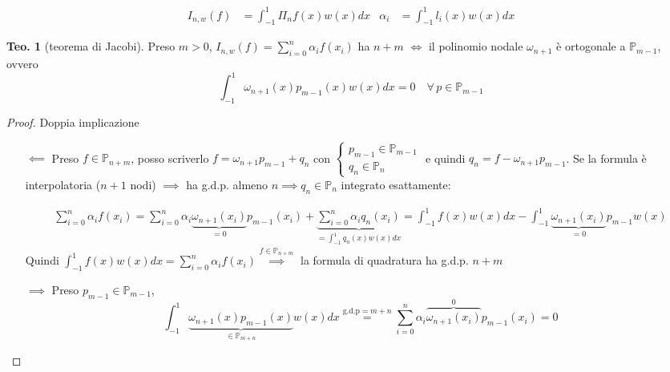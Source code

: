 \documentclass[a4paper,10pt]{article}
\theoremstyle{definition}
\theoremstyle{indentdefinition}
\theoremstyle{indenttheorem}
\newtheorem{thm}{Teo.}
\theoremstyle{myremark}
\theoremstyle{indentgeneral}
\theoremstyle{plain}
\theoremstyle{plain}
\newenvironment{myboxed} 
{\noindent\begin{lrbox}{\mybox}\begin{minipage}{\textwidth}}
{\end{minipage}\end{lrbox}\fbox{\usebox{\mybox}}}
\begin{document}
\begin{align*}
I_{n,w}\left(f\right) & =\int_{-1}^{1}\Pi_{n}f\left(x\right)w\left(x\right)dx & \alpha_{i} & =\int_{-1}^{1}l_{i}\left(x\right)w\left(x\right)dx
\end{align*}

\begin{myboxed}
\begin{thm}[teorema di Jacobi]
Preso $m>0$, $I_{n,w}(f)=\sum_{i=0}^{n}\alpha_{i}f\left(x_{i}\right)$ ha  $n+m$
$\Longleftrightarrow$ il polinomio nodale $\omega_{n+1}$ è ortogonale
a $\mathbb{P}_{m-1}$, ovvero $$\int_{-1}^{1}\omega_{n+1}\left(x\right)p_{m-1}\left(x\right)w\left(x\right)dx=0\quad\forall\,p\in\mathbb{P}_{m-1}$$
\end{thm}
\end{myboxed}

\begin{proof}
Doppia implicazione\\
\begin{itemize}
    \item[$\impliedby$] Preso $f\in\mathbb{P}_{n+m}$, posso scriverlo
$f=\omega_{n+1}p_{m-1}+q_{n}$ con $\begin{cases}
    p_{m-1}\in\mathbb{P}_{m-1} \\
    q_{n}\in\mathbb{P}_{n}
\end{cases}$ e quindi $q_n=f-\omega_{n+1}p_{m-1}$. Se la formula è interpolatoria ($n+1$ nodi) $\implies$ ha g.d.p. almeno $n\implies q_n\in\mathbb{P}_n$ integrato esattamente:

\begin{align*}
\sum_{i=0}^{n}\alpha_{i}f\left(x_{i}\right)=\sum_{i=0}^n\alpha_i\underbrace{\omega_{n+1}(x_i)}_{=0}p_{m-1}(x_i)+\underbrace{\sum_{i=0}^{n}\alpha_{i}q_{n}\left(x_{i}\right)}_{=\int_{-1}^1q_n(x)w(x)dx}=\int_{-1}^{1}f(x)w(x)dx-\int_{-1}^{1}\underbrace{\omega_{n+1}(x_i)}_{=0}p_{m-1}w(x)
\end{align*}
Quindi $\int_{-1}^{1}f(x)w(x)dx=\sum_{i=0}^{n}\alpha_{i}f\left(x_{i}\right)\overset{f\in\mathbb{P}_{n+m}}{\implies}$ la formula di quadratura ha g.d.p. $n+m$

\item[$\implies$]Preso $p_{m-1}\in\mathbb{P}_{m-1}$,
\[
\int_{-1}^{1}\underbrace{\omega_{n+1}\left(x\right)p_{m-1}\left(x\right)}_{\in\mathbb{P}_{m+n}}w\left(x\right)dx\overset{\text{g.d.p}=m+n}{=}\sum_{i=0}^{n}\alpha_{i}\overset{0}{\overbrace{\omega_{n+1}\left(x_{i}\right)}}p_{m-1}\left(x_{i}\right)=0
\]
\end{itemize}
\end{proof}
\end{document}

